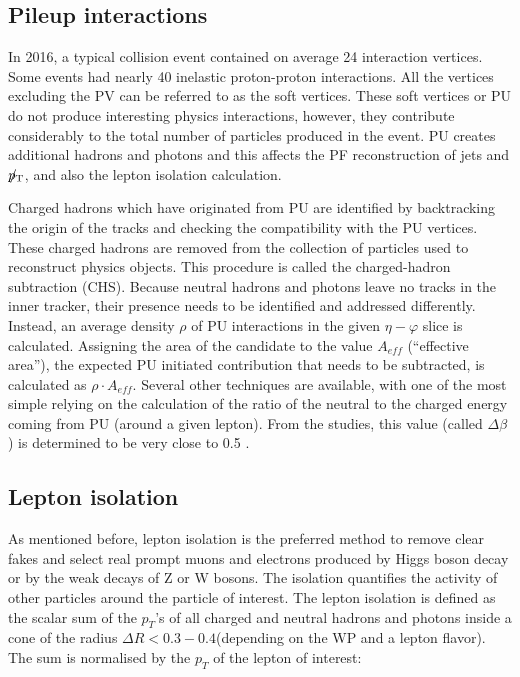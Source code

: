 \subsection{Pileup interactions}\label{sec:pileup}

In 2016, a typical collision event contained on average 24 interaction vertices. Some events had nearly 40 inelastic proton-proton interactions. All the vertices excluding the PV can be referred to as the soft vertices. These soft vertices or PU do not produce interesting physics interactions, however, they contribute considerably to the total number of particles produced in the event. PU creates additional hadrons and photons and this affects the PF reconstruction of jets and ${p}_\mathrm{T}\hspace{-1.02em}/\kern 0.5em$, and also the lepton isolation calculation.

Charged hadrons which have originated from PU are identified by backtracking the origin of the tracks and checking the compatibility with the PU vertices. These charged hadrons are removed from the collection of particles used to reconstruct physics objects. This procedure is called the charged-hadron subtraction (CHS). Because neutral hadrons and photons leave no tracks in the inner tracker, their presence needs to be identified and addressed differently. Instead, an average density $\rho$ of PU interactions in the given $\eta - \varphi$ slice is calculated. Assigning the area of the candidate to the value $A_{eff}$ (``effective area''), the expected PU initiated contribution that needs to be subtracted, is calculated as $\rho \cdot A_{eff}$. Several other techniques are available, with one of the most simple relying on the calculation of the ratio of the neutral to the charged energy coming from PU (around a given lepton). From the studies, this value (called $\Delta \beta$) is determined to be very close to 0.5 \cite{PU_mitigation}. 

\subsection{Lepton isolation}\label{sec:isolation}

As mentioned before, lepton isolation is the preferred method to remove clear fakes and select real  prompt  muons  and  electrons  produced  by Higgs boson decay or by the weak decays of Z or W bosons. The isolation quantifies the activity of other particles around the particle of interest. The lepton isolation is defined as the scalar sum of the $p_T$'s of all charged and neutral hadrons and photons inside a cone of the radius $\Delta R <  0.3 - 0.4 $(depending on the WP and a lepton flavor). The sum is normalised by the $p_T$ of the lepton of interest:

